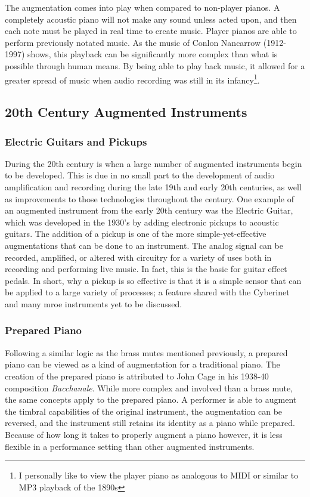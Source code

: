 The augmentation comes into play when compared to non-player pianos. A completely acoustic piano will not make any sound unless acted upon, and then each note must be played in real time to create music. Player pianos are able to perform previously notated music. As the music of Conlon Nancarrow (1912-1997) shows, this playback can be significantly more complex than what is possible through human means. By being able to play back music, it allowed for a greater spread of music when audio recording was still in its infancy\footnote{I personally like to view the player piano as analogous to MIDI or similar to MP3 playback of the 1890s}. 

\subsection{20th Century Augmented Instruments}

\subsubsection{Electric Guitars and Pickups}
During the 20th century is when a large number of augmented instruments begin to be developed. This is due in no small part to the development of audio amplification and recording during the late 19th and early 20th centuries, as well as improvements to those technologies throughout the century. One example of an augmented instrument from the early 20th century was the Electric Guitar, which was developed in the 1930's by adding electronic pickups to acoustic guitars\cite{electric_guit_history}. The addition of a pickup is one of the more simple-yet-effective augmentations that can be done to an instrument. The analog signal can be recorded, amplified, or altered with circuitry for a variety of uses both in recording and performing live music. In fact, this is the basic for guitar effect pedals. In short, why a pickup is so effective is that it is a simple sensor that can be applied to a large variety of processes; a feature shared with the Cyberinet and many mroe instruments yet to be discussed.

\subsubsection{Prepared Piano}

Following a similar logic as the brass mutes mentioned previously, a prepared piano can be viewed as a kind of augmentation for a traditional piano. The creation of the prepared piano is attributed to John Cage in his 1938-40 composition \textit{Bacchanale}. While more complex and involved than a brass mute, the same concepts apply to the prepared piano. A performer is able to augment the timbral capabilities of the original instrument, the augmentation can be reversed, and the instrument still retains its identity as a piano while prepared. Because of how long it takes to properly augment a piano however, it is less flexible in a performance setting than other augmented instruments. 

